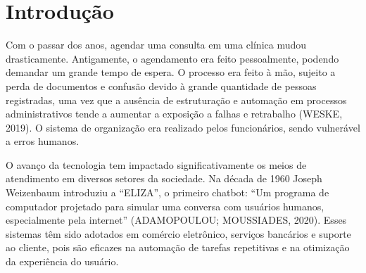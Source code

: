 \documentclass[12pt,a4paper]{extarticle}
\begin{document}
\newpage
\listoffigures

\newpage
\listoftables


\newpage


\vspace{0.5cm}

\makeatletter
{}
\makeatother


\newpage
\renewcommand{\contentsname}{\centerline{SUMÁRIO}}
\tableofcontents

\newpage
\onehalfspacing

\section{Introdução}
\label{cap:intro}
Com o passar dos anos, agendar uma consulta em uma clínica mudou drasticamente. Antigamente, o agendamento era feito pessoalmente, podendo demandar um grande tempo de espera. O processo era feito à mão, sujeito a perda de documentos e confusão devido à grande quantidade de pessoas registradas, uma vez que a ausência de estruturação e automação em processos administrativos tende a aumentar a exposição a falhas e retrabalho (WESKE, 2019). O sistema de organização era realizado pelos funcionários, sendo vulnerável a erros humanos.

O avanço da tecnologia tem impactado significativamente os meios de atendimento em diversos setores da sociedade. Na década de 1960 Joseph Weizenbaum introduziu a ``ELIZA'', o primeiro chatbot: ``Um programa de computador projetado para simular uma conversa com usuários humanos, especialmente pela internet'' (ADAMOPOULOU; MOUSSIADES, 2020). Esses sistemas têm sido adotados em comércio eletrônico, serviços bancários e suporte ao cliente, pois são eficazes na automação de tarefas repetitivas e na otimização da experiência do usuário.
\end{document}
